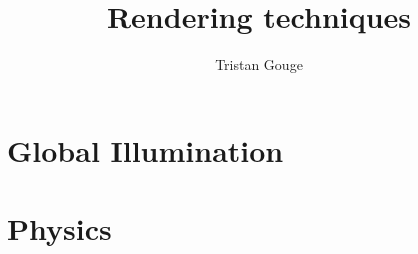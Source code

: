 \documentclass[a4paper,12pt]{scrbook}
\begin{document}
\title{Rendering techniques}
\author{Tristan Gouge}
\date{}
\maketitle

\frontmatter
\tableofcontents

\mainmatter

\chapter{Global Illumination}
\label{ch:global_illumination}


\chapter{Physics}
\label{ch:physics}


\backmatter

\cite{haines_ray_nodate}

\printbibliography
\end{document}
